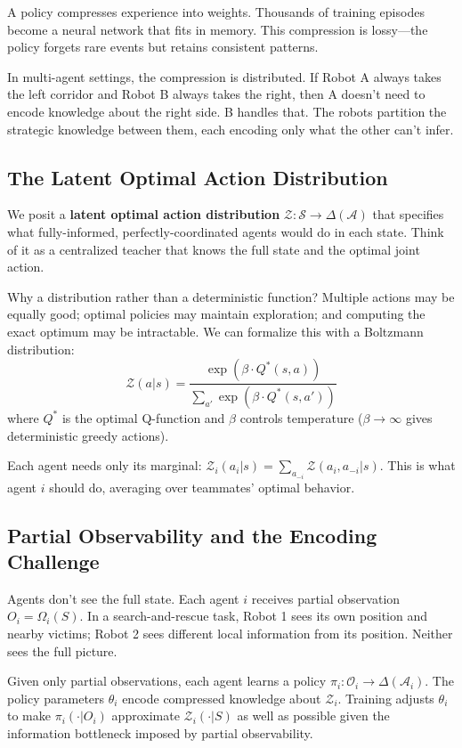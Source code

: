\documentclass[10pt, letterpaper]{article}
\begin{document}
A policy compresses experience into weights. Thousands of training episodes become a neural network that fits in memory. This compression is lossy---the policy forgets rare events but retains consistent patterns.

In multi-agent settings, the compression is distributed. If Robot A always takes the left corridor and Robot B always takes the right, then A doesn't need to encode knowledge about the right side. B handles that. The robots partition the strategic knowledge between them, each encoding only what the other can't infer.

\subsection{The Latent Optimal Action Distribution}

We posit a \textbf{latent optimal action distribution} $\mathcal{Z}: \mathcal{S} \to \Delta(\mathcal{A})$ that specifies what fully-informed, perfectly-coordinated agents would do in each state. Think of it as a centralized teacher that knows the full state and the optimal joint action.

Why a distribution rather than a deterministic function? Multiple actions may be equally good; optimal policies may maintain exploration; and computing the exact optimum may be intractable. We can formalize this with a Boltzmann distribution:
\[\mathcal{Z}(a|s) = \frac{\exp(\beta \cdot Q^*(s,a))}{\sum_{a'} \exp(\beta \cdot Q^*(s,a'))}\]
where $Q^*$ is the optimal Q-function and $\beta$ controls temperature ($\beta \to \infty$ gives deterministic greedy actions).

Each agent needs only its marginal: $\mathcal{Z}_i(a_i|s) = \sum_{a_{-i}} \mathcal{Z}(a_i, a_{-i}|s)$. This is what agent $i$ should do, averaging over teammates' optimal behavior.

\subsection{Partial Observability and the Encoding Challenge}

Agents don't see the full state. Each agent $i$ receives partial observation $O_i = \Omega_i(S)$. In a search-and-rescue task, Robot 1 sees its own position and nearby victims; Robot 2 sees different local information from its position. Neither sees the full picture.

Given only partial observations, each agent learns a policy $\pi_i: \mathcal{O}_i \to \Delta(\mathcal{A}_i)$. The policy parameters $\theta_i$ encode compressed knowledge about $\mathcal{Z}_i$. Training adjusts $\theta_i$ to make $\pi_i(\cdot|O_i)$ approximate $\mathcal{Z}_i(\cdot|S)$ as well as possible given the information bottleneck imposed by partial observability.
\end{document}
